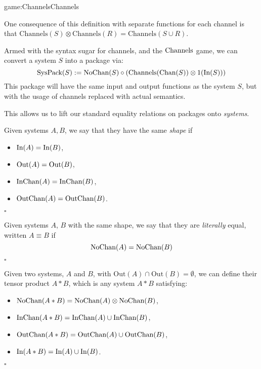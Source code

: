 \begin{game}{game:Channels}{Channels}
\end{game}

One consequence of this definition with separate functions for each channel
is that $\text{Channels}(S) \otimes \text{Channels}(R) = \text{Channels}(S \cup R)$.

Armed with the syntax sugar for channels, and the $\text{Channels}$ game,
we can convert a system $S$ into a package via:
$$
\text{SysPack}(S) := \text{NoChan}(S) \circ (\text{Channels}(\text{Chan}(S)) \otimes 1(\text{In}(S)))
$$
This package will have the same input and output functions as the system $S$,
but with the usage of channels replaced with actual semantics.

This allows us to lift our standard equality relations on packages onto
\emph{systems}.

\begin{definition}
  Given systems $A, B$, we say that they have the same \emph{shape} if
  \begin{itemize}
    \item $\text{In}(A) = \text{In}(B)$,
    \item $\text{Out}(A) = \text{Out}(B)$,
    \item $\text{InChan}(A) = \text{InChan}(B)$,
    \item $\text{OutChan}(A) = \text{OutChan}(B)$.
  \end{itemize}

  $\square$
\end{definition}

\begin{definition}
  Given systems $A$, $B$ with the same shape, we say that they are \emph{literally} equal, written $A \equiv B$ if
  $$
  \text{NoChan}(A) = \text{NoChan}(B)
  $$

  $\square$
\end{definition}

\begin{definition}
Given two systems, $A$ and $B$, with \(\text{Out}(A) \cap \text{Out}(B) = \emptyset\), we can define their tensor product $A * B$,
which is any system $A * B$ satisfying:
\begin{itemize}
  \item $\text{NoChan}(A * B) = \text{NoChan}(A) \otimes \text{NoChan}(B)$,
  \item $\text{InChan}(A * B) = \text{InChan}(A) \cup \text{InChan}(B)$,
  \item $\text{OutChan}(A * B) = \text{OutChan}(A) \cup \text{OutChan}(B)$,
  \item $\text{In}(A * B) = \text{In}(A) \cup \text{In}(B)$.
\end{itemize}

$\square$
\end{definition}

